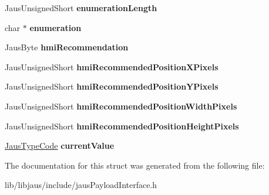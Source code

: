 \begin{DoxyCompactItemize}
\item 
\hypertarget{struct_jaus_information_interface_struct_a6c37c71503c4b25b826e69eb43804a3d}{\-Jaus\-Unsigned\-Short {\bfseries enumeration\-Length}}\label{struct_jaus_information_interface_struct_a6c37c71503c4b25b826e69eb43804a3d}

\item 
\hypertarget{struct_jaus_information_interface_struct_a3be3b97d20de051c222c7f4a79712409}{char $\ast$ {\bfseries enumeration}}\label{struct_jaus_information_interface_struct_a3be3b97d20de051c222c7f4a79712409}

\item 
\hypertarget{struct_jaus_information_interface_struct_a39bdeaeffa022386491be8d5bcc97858}{\-Jaus\-Byte {\bfseries hmi\-Recommendation}}\label{struct_jaus_information_interface_struct_a39bdeaeffa022386491be8d5bcc97858}

\item 
\hypertarget{struct_jaus_information_interface_struct_a855a8cda33f4292ff835468cff336df4}{\-Jaus\-Unsigned\-Short {\bfseries hmi\-Recommended\-Position\-X\-Pixels}}\label{struct_jaus_information_interface_struct_a855a8cda33f4292ff835468cff336df4}

\item 
\hypertarget{struct_jaus_information_interface_struct_a4c5cb9ae1081fdb30984eac5579a7f8a}{\-Jaus\-Unsigned\-Short {\bfseries hmi\-Recommended\-Position\-Y\-Pixels}}\label{struct_jaus_information_interface_struct_a4c5cb9ae1081fdb30984eac5579a7f8a}

\item 
\hypertarget{struct_jaus_information_interface_struct_a232c0a059a26e2d7b2e3b1a2772bead1}{\-Jaus\-Unsigned\-Short {\bfseries hmi\-Recommended\-Position\-Width\-Pixels}}\label{struct_jaus_information_interface_struct_a232c0a059a26e2d7b2e3b1a2772bead1}

\item 
\hypertarget{struct_jaus_information_interface_struct_ac7015822ec6c1aaa5c9b6d3da099ee0c}{\-Jaus\-Unsigned\-Short {\bfseries hmi\-Recommended\-Position\-Height\-Pixels}}\label{struct_jaus_information_interface_struct_ac7015822ec6c1aaa5c9b6d3da099ee0c}

\item 
\hypertarget{struct_jaus_information_interface_struct_a1fcd94857d97ee34d64ccf32dd0e80f0}{\hyperlink{union_jaus_type_code}{\-Jaus\-Type\-Code} {\bfseries current\-Value}}\label{struct_jaus_information_interface_struct_a1fcd94857d97ee34d64ccf32dd0e80f0}

\end{DoxyCompactItemize}


\-The documentation for this struct was generated from the following file\-:\begin{DoxyCompactItemize}
\item 
lib/libjaus/include/jaus\-Payload\-Interface.\-h\end{DoxyCompactItemize}
